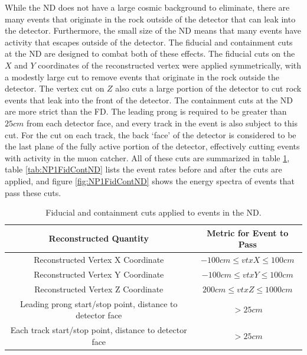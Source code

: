 While the ND does not have a large cosmic background to eliminate, there are many events that originate in the rock outside of the detector that can leak into the detector. Furthermore, the small size of the ND means that many events have activity that escapes outside of the detector. The fiducial and containment cuts at the ND are designed to combat both of these effects. The fiducial cuts on the $X$ and $Y$ coordinates of the reconstructed vertex were applied symmetrically, with a modestly large cut to remove events that originate in the rock outside the detector. The vertex cut on $Z$ also cuts a large portion of the detector to cut rock events that leak into the front of the detector. The containment cuts at the ND are more strict than the FD. The leading prong is required to be greater than $25\unit{cm}$ from each detector face, and every track in the event is also subject to this cut. For the cut on each track, the back `face' of the detector is considered to be the last plane of the fully active portion of the detector, effectively cutting events with activity in the muon catcher. All of these cuts are summarized in table \ref{tab:FidContND}, table \ref{tab:NP1FidContND} lists the event rates before and after the cuts are applied, and figure \ref{fig:NP1FidContND} shows the energy spectra of events that pass these cuts.
\begin{table}[htb]
  \begin{center}
    \caption[ND Fiducial and Containment Cuts]{Fiducial and containment cuts applied to events in the ND.}
    \label{tab:FidContND}
    \begin{tabular}{c c}
      \hline\hline
      Reconstructed Quantity & Metric for Event to Pass \\
      \hline
      Reconstructed Vertex X Coordinate & $-100\unit{cm} \leq vtxX \leq 100\unit{cm} $ \\
      Reconstructed Vertex Y Coordinate & $-100\unit{cm} \leq vtxY \leq 100\unit{cm}$ \\
      Reconstructed Vertex Z Coordinate & $200\unit{cm} \leq vtxZ \leq 1000\unit{cm}$ \\
      Leading prong start/stop point, distance to detector face & $> 25\unit{cm}$ \\
      Each track start/stop point, distance to detector face & $> 25\unit{cm}$ \\
      \hline
    \end{tabular}
  \end{center}
\end{table}

